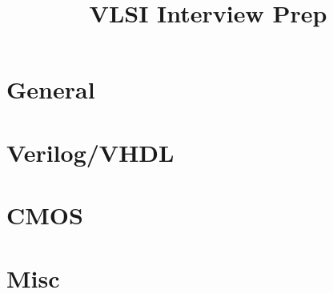 \documentclass{article}
\title{VLSI Interview Prep}
\date{}
\begin{document}
\maketitle

\section*{General}


\section*{Verilog/VHDL}


\section*{CMOS}


\section*{Misc}




\end{document}
